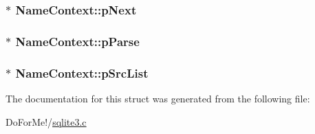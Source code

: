 \hypertarget{struct_name_context_a82ce0ec8a3cc3d792e1f38bb5e0ad5fc}{
\subsubsection[{p\-Next}]{$\ast$ Name\-Context\-::p\-Next}}\label{struct_name_context_a82ce0ec8a3cc3d792e1f38bb5e0ad5fc}
\hypertarget{struct_name_context_a14635249bf75d5e18124089571dd2386}{
\subsubsection[{p\-Parse}]{$\ast$ Name\-Context\-::p\-Parse}}\label{struct_name_context_a14635249bf75d5e18124089571dd2386}
\hypertarget{struct_name_context_a6ede21da33e2e9bd3d0c5fe90a3ec72c}{
\subsubsection[{p\-Src\-List}]{$\ast$ Name\-Context\-::p\-Src\-List}}\label{struct_name_context_a6ede21da33e2e9bd3d0c5fe90a3ec72c}


The documentation for this struct was generated from the following file\-:\begin{DoxyCompactItemize}
\item 
Do\-For\-Me!/\hyperlink{sqlite3_8c}{sqlite3.\-c}\end{DoxyCompactItemize}
